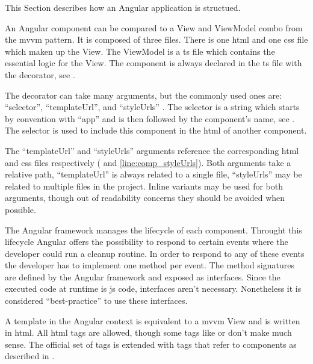 

This Section describes how an Angular application is structued.


An Angular component can be compared to a View and ViewModel combo from the \gls{mvvm} pattern. It is composed of three files. There is one \gls{html} and one \gls{css} file which maken up the View. The ViewModel is a \gls{ts} file which contains the essential logic for the View. The component is always declared in the \gls{ts} file with the  decorator, see .


The  decorator can take many arguments, but the commonly used ones are: \enquote{selector}, \enquote{templateUrl}, and \enquote{styleUrls} \cite{ngcomponent}. The selector is a string which starts by convention with \enquote{app} and is then followed by the component's name, see . The selector is used to include this component in the \gls{html} of another component.

The \enquote{templateUrl} and \enquote{styleUrls} arguments reference the corresponding \gls{html} and \gls{css} files respectively ( and \ref{line:comp_styleUrls}). Both arguments take a relative path, \enquote{templateUrl} is always related to a single file, \enquote{styleUrls} may be related to multiple files in the project. Inline variants may be used for both arguments, though out of readability concerns they should be avoided when possible.

The Angular framework manages the lifecycle of each component. Throught this lifecycle Angular offers the possibility to respond to certain events \zB {} where the developer could run a cleanup routine. In order to respond to any of these events the developer has to implement one method per event. The method signatures are defined by the Angular framework and exposed as interfaces. Since the executed code at runtime is \gls{js} code, interfaces aren't necessary. Nonetheless it is considered \enquote{best-practice} to use these interfaces.

A template in the Angular context is equivalent to a \gls{mvvm} View and is written in \gls{html}. All \gls{html} tags are allowed, though some tags like  or  don't make much sense. The official set of tags is extended with tags that refer to components as described in .

